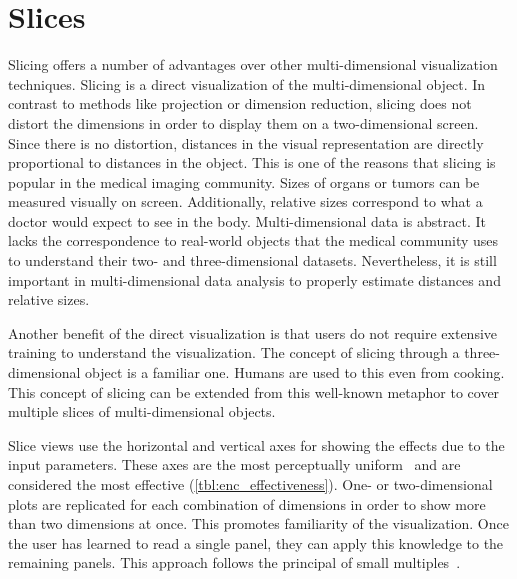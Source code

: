 
\section{Slices}
\label{sec:slicing-advantages}

Slicing offers a number of advantages over other multi-dimensional
visualization techniques. Slicing is a direct visualization of the
multi-dimensional object. In contrast to methods like projection or dimension
reduction, slicing does not distort the dimensions in order to display them on
a two-dimensional screen. Since there is no distortion, distances in the visual
representation are directly proportional to distances in the object. This is
one of the reasons that slicing is popular in the medical imaging community.
Sizes of organs or tumors can be measured visually on screen. Additionally,
relative sizes correspond to what a doctor would expect to see in the body.
Multi-dimensional data is abstract. It lacks the correspondence to real-world
objects that the medical community uses to understand their two- and
three-dimensional datasets. Nevertheless, it is still important in
multi-dimensional data analysis to properly estimate distances and relative
sizes. 

Another benefit of the direct visualization is that users do not require
extensive training to understand the visualization. The concept of slicing
through a three-dimensional object is a familiar one. Humans are used to this
even from cooking. This concept of slicing can be extended from this 
well-known metaphor to cover multiple slices of multi-dimensional objects.

Slice views use the horizontal and vertical axes for showing the effects due to
the input parameters. These axes are the most perceptually
uniform~\cite{Stevens:1957} and are considered the most effective
(\autoref{tbl:enc_effectiveness}). One- or two-dimensional
plots are replicated for each combination of dimensions in order to show more
than two dimensions at once. This promotes familiarity of the visualization.
Once the user has learned to read a single panel, they can apply this knowledge
to the remaining panels. This approach follows the principal of small
multiples~\cite{Archambault:2011}. 

